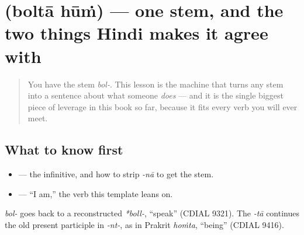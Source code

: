 \section[\texorpdfstring{\hi{बोलता} \hi{हूँ}, \hi{बोलती} … (boltā hūṁ, boltī …)}{बोलता हूँ, बोलती … (boltā hūṁ, boltī …)}]{  (boltā hūṁ) — one stem, and the two things Hindi makes it agree with}

\label{lesson:HI-C05-bolta-hun}



\begin{quote}
You have the stem \emph{bol-}. This lesson is the machine that turns any stem into a sentence about what someone \emph{does} — and it is the single biggest piece of leverage in this book so far, because it fits every verb you will ever meet.
\end{quote}

\subsection*{What to know first}
\begin{itemize}
\raggedright
  \item {} — the infinitive, and how to strip \emph{-nā} to get the stem.
  \item {} — \textquotedblleft{}I am,\textquotedblright{} the verb this template leans on.
\end{itemize}

\begin{cousinweb}
\emph{bol-} goes back to a reconstructed \emph{*boll-}, \textquotedblleft{}speak\textquotedblright{} (CDIAL 9321). The \emph{-tā} continues the old present participle in \emph{-nt-}, as in Prakrit \emph{hoṁta}, \textquotedblleft{}being\textquotedblright{} (CDIAL 9416).
\end{cousinweb}

